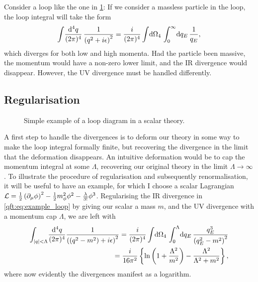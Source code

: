 \documentclass[../main.tex]{subfiles}
\begin{document}
\begin{donotread}
  Consider a loop like the one in \cref{qft:fig:example_loop}: If we consider a
  massless particle in the loop, the loop integral will take the form
  \begin{equation}
    \label{qft:eq:example_loop}
    \loopintegral[4]{q} \frac{1}{\pclosed{q^2 + i\epsilon}^2} =
    \frac{i}{(2\pi)^4} \integral{\Omega_4} \integral[_0^\infty]{q_E}
    \frac{1}{q_E},
  \end{equation}
  which diverges for both low and high momenta.  Had the particle been
  massive, the momentum would have a non-zero lower limit, and the IR divergence
  would disappear.
  However, the UV divergence must be handled differently.

  \subsection{Regularisation}

  \begin{figure}[!h]
    \centering
    \caption{Simple example of a loop diagram in a scalar theory.}
    \label{qft:fig:example_loop}
  \end{figure}

  A first step to handle the divergences is to deform our theory in some way to
  make the loop integral formally finite, but recovering the divergence in the
  limit that the deformation disappears. An intuitive deformation would be to cap
  the momentum integral at some \(\Lambda\), recovering our original theory in
  the limit \(\Lambda \to \infty\). To illustrate the procedure of regularisation
  and subsequently renormalisation, it will be useful to have an example, for
  which I choose a scalar Lagrangian \(\L = \frac{1}{2} \pclosed{\partial_\mu
    \phi}^2 - \frac{1}{2}m_\phi^2 \phi^2 - \frac{\lambda}{3!} \phi^3\).
   Regularising the IR divergence
  in \cref{qft:eq:example_loop} by giving our scalar a mass \(m\), and the UV
  divergence with a momentum cap \(\Lambda\), we are left with
  \begin{align}
    \nonumber
    \int_{\abs{q} < \Lambda}\! \frac{\mathrm{d}^4q}{(2\pi)^4}
    \frac{1}{\pclosed{(q^2-m^2)+i\epsilon}^2} = \frac{i}{(2\pi)^4}
    \integral{\Omega_4} \integral[_0^\Lambda]{q_E} \frac{q_E^3}{\pclosed{q_E^2
        -
    m^2}^2} \\
    = \frac{i}{16\pi^2} \cclosed{\ln\pclosed{1 + \frac{\Lambda^2}{m^2}} -
      \frac{\Lambda^2}{\Lambda^2 + m^2}},
  \end{align}
  where now evidently the divergences manifest as a logarithm.
  \medskip


\end{donotread}
\end{document}
